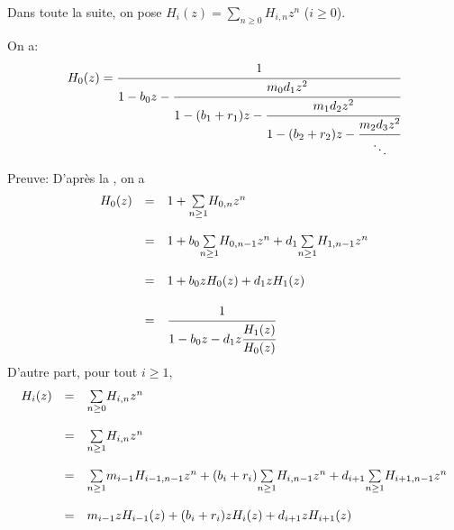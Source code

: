 Dans toute la suite, on pose $H_{i}(z) = \underset{n\geq 0}{\sum}H_{i, n}z^{n}$ ($i\geq 0$).
\begin{proposition}\label{H-frac} On a:
	\[
		\begin{array}{r c l}
			H_{0}(z)=\cfrac{1}{1-b_{0}z-\cfrac{m_{0}d_{1}z^2}{1-(b_{1}+r_{1})z-\cfrac{m_{1}d_{2}z^2}
			{1-(b_{2}+r_{2})z-\cfrac{m_{2}d_{3}z^2}{\ddots}}}}
		\end{array}
	\]
\end{proposition}
Preuve:
D'après la , on a
$$
	\begin{array}{r c l}
		H_{0}(z) & =       & 1+\underset{n\geq1}{\sum}H_{0,n}z^n                                                 \\
		         & \text{}                                                                                       \\
		         & =       & 1+b_{0}\underset{n\geq1}{\sum}H_{0,n-1}z^n+d_{1}\underset{n\geq1}{\sum}H_{1,n-1}z^n \\
		         & \text{}                                                                                       \\
		         & =       & 1+b_{0}zH_{0}(z)+d_{1}zH_{1}(z)                                                     \\
		         & \text{}                                                                                       \\
		         & =       & \cfrac{1}{1-b_{0}z-d_{1}z\cfrac{H_{1}(z)}{H_{0}(z)}}
	\end{array}
$$
D'autre part, pour tout $i\geq1$,
\[
	\begin{array}{r c l}
		H_{i}(z) & =       & \underset{n\geq0}{\sum}H_{i,n}z^n                                                                     \\
		         & \text{} &                                                                                                       \\
		         & =       & \underset{n\geq1}{\sum}H_{i,n}z^n                                                                     \\
		         & \text{} &                                                                                                       \\
		         & =       & \underset{n\geq1}{\sum}m_{i-1}H_{i-1,n-1}z^n+(b_{i}+r_{i})\underset{n\geq1}{\sum}H_{i,n-1}z^n+d_{i+1}
		\underset{n\geq 1}{\sum}H_{i+1,n-1}z^n                                                                                       \\
		         & \text{} &                                                                                                       \\
		         & =       & m_{i-1}zH_{i-1}(z)+(b_{i}+r_{i})zH_{i}(z)+d_{i+1}zH_{i+1}(z)
	\end{array}
\]
